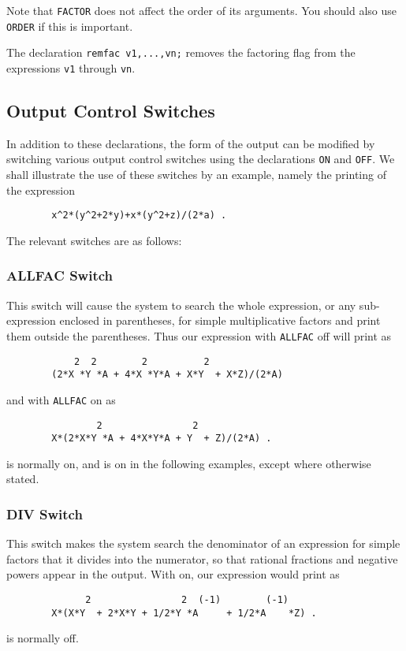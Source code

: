 Note that \texttt{FACTOR} does not affect the order of its arguments.  You
should also use \texttt{ORDER} if this is important.

\hypertarget{command:REMFAC}{}
The declaration \texttt{remfac v1,...,vn;} removes the
factoring flag from the expressions \texttt{v1} through \texttt{vn}.

\subsection{Output Control Switches}
\label{sec-output}
In addition to these declarations, the form of the output can be modified
by switching various output control switches using the declarations
\texttt{ON} and \texttt{OFF}.  We shall illustrate the use of these switches by an
example, namely the printing of the expression
\begin{verbatim}
        x^2*(y^2+2*y)+x*(y^2+z)/(2*a) .
\end{verbatim}
The relevant switches are as follows:

\subsubsection{ALLFAC Switch}
\hypertarget{switch:ALLFAC}{}

This switch will cause the system to search the whole expression, or any
sub-expression enclosed in parentheses, for simple multiplicative factors
and print them outside the parentheses. Thus our expression with \texttt{ALLFAC}
off will print as
\begin{verbatim}
            2  2        2          2
        (2*X *Y *A + 4*X *Y*A + X*Y  + X*Z)/(2*A)
\end{verbatim}
and with \texttt{ALLFAC} on as
\begin{verbatim}
                2                2
        X*(2*X*Y *A + 4*X*Y*A + Y  + Z)/(2*A) .
\end{verbatim}
 is normally on, and is on in the following examples, except
where otherwise stated.

\subsubsection{DIV Switch}
\hypertarget{switch:DIV}{}

This switch makes the system search the denominator of an expression for
simple factors that it divides into the numerator, so that rational
fractions and negative powers appear in the output. With  on, our
expression would print as
\begin{verbatim}
              2                2  (-1)        (-1)
        X*(X*Y  + 2*X*Y + 1/2*Y *A     + 1/2*A    *Z) .
\end{verbatim}
 is normally off.

